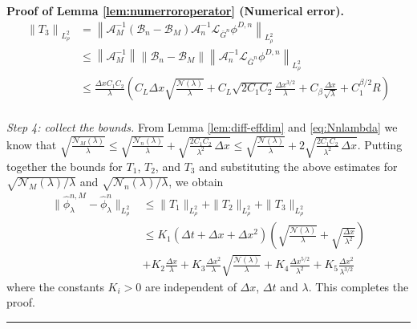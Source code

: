 \documentclass[12pt]{article}
\newenvironment{proof}[1][Proof]{\noindent\textbf{#1.} }{\ \rule{0.5em}{0.5em}}
\numberwithin{equation}{section}
\numberwithin{theorem}{section}
\begin{document}
\begin{proof}[Proof of Lemma \ref{lem:numerroroperator} (Numerical error)]
$$
\begin{aligned}
\left\|T_3\right\|_{L_\rho^2} & =\left\|\mathcal{A}_M^{-1}\left(\mathcal{B}_n-\mathcal{B}_M\right) \mathcal{A}_n^{-1} \mathcal{L}_{\bar{G}^n} \phi^{D, n}\right\|_{L_\rho^2} \\
& \leq\left\|\mathcal{A}_M^{-1}\right\|\left\|\mathcal{B}_n-\mathcal{B}_M\right\|\left\|\mathcal{A}_n^{-1} \mathcal{L}_{\bar{G}^n} \phi^{D, n}\right\|_{L_\rho^2} \\
& \leq \frac{\Delta x C_1C_2}{\lambda}\left(C_L \Delta x \sqrt{\frac{\mathcal{N}(\lambda)}{\lambda}}+C_L \sqrt{2 C_1 C_2} \frac{\Delta x^{3 / 2}}{\lambda}+C_\beta \frac{\Delta x}{\sqrt{\lambda}}+C_1^{\beta / 2} R\right)\\ 
\end{aligned}
$$
 

\medskip\noindent
\emph{Step 4: collect the bounds.} From  Lemma \ref{lem:diff-effdim} and \eqref{eq:Nnlambda} we know that $\sqrt{\frac{\mathcal{N}_M(\lambda)}{\lambda}} \le \sqrt{\frac{\mathcal{N}_n(\lambda)}{\lambda}} + \sqrt{\frac{2C_1C_2}{\lambda^2}\,\Delta x} \le \sqrt{\frac{\mathcal{N}(\lambda)}{\lambda}} + 2\sqrt{\frac{2C_1C_2}{\lambda^2}\,\Delta x}$. Putting together the bounds for $T_1$, $T_2$, and $T_3$ and substituting the above estimates for 
$\sqrt{\mathcal{N}_M(\lambda)/\lambda}$ and $\sqrt{\mathcal{N}_n(\lambda)/\lambda}$, we obtain
$$
\begin{aligned}
\|\hat{\phi}_\lambda^{n,M}-\hat{\phi}_\lambda^n\|_{L^2_\rho}
&\le \|T_1\|_{L^2_\rho} + \|T_2\|_{L^2_\rho} + \|T_3\|_{L^2_\rho} \\
& \leq K_1\left(\Delta t+\Delta x+\Delta x^2\right)\left(\sqrt{\frac{\mathcal{N}(\lambda)}{\lambda}}+\sqrt{\frac{\Delta x}{\lambda^2}}\right) \\ & +K_2 \frac{\Delta x}{\lambda}+K_3 \frac{\Delta x^2}{\lambda} \sqrt{\frac{\mathcal{N}(\lambda)}{\lambda}}+K_4 \frac{\Delta x^{5 / 2}}{\lambda^2} + K_5\frac{\Delta x^{2}}{\lambda^{3/2}}
\end{aligned}
$$
where the constants $K_i >0$ are independent of $\Delta x$, $\Delta t$ and $\lambda$.
This completes the proof.
\end{proof}
\end{document}
